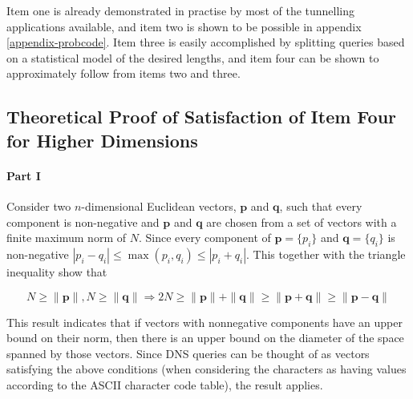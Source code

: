 \documentclass[12pt]{report}
\theoremstyle{remark}
\theoremstyle{definition}
\theoremstyle{definition}
\theoremstyle{definition}
\begin{document}
Item one is already demonstrated in practise by most of the tunnelling
applications available, and item two is shown to be possible in appendix
\ref{appendix-probcode}. Item three is easily accomplished by splitting queries based
on a statistical model of the desired lengths, and item four can be shown to
approximately follow from items two and three.


\subsection{Theoretical Proof of Satisfaction of Item Four for Higher Dimensions}
\label{item-four-theory}

\paragraph{Part I} Consider two $n$-dimensional Euclidean vectors, $\mathbf p$ and $\mathbf q$,
such that every component is non-negative and $\mathbf p$ and $\mathbf q$ are
chosen from a set of vectors with a finite maximum norm of $N$. Since every
component of $\mathbf p=\{p_i\}$ and $\mathbf q=\{q_i\}$ is non-negative
$|p_i-q_i|\leq\max{(p_i,q_i)}\leq|p_i+q_i|$. This together with the triangle
inequality show that

\begin{equation}
N\geq\|\mathbf p\|,N\geq\|\mathbf q\|\Rightarrow 2N\geq\|\mathbf p\|+\|\mathbf
q\|\geq\|\mathbf p+\mathbf q\|\geq\|\mathbf p-\mathbf q\|
\end{equation}

This result indicates that if vectors with nonnegative components have an upper
bound on their norm, then there is an upper bound on the diameter of the space
spanned by those vectors. Since DNS queries can be thought of as vectors
satisfying the above conditions (when considering the characters as having values
according to the ASCII character code table\cite{asciitable}), the result
applies.
\end{document}
